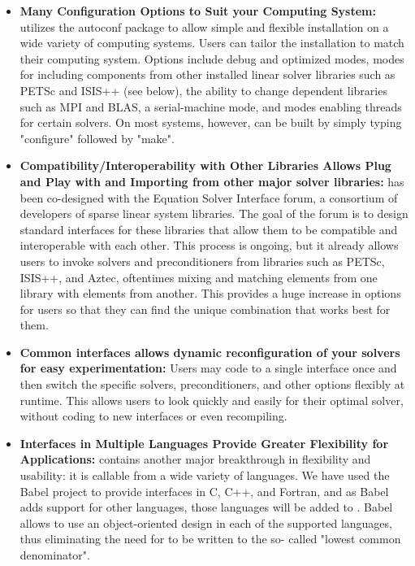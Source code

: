 \begin{itemize}
\item
{\bf Many Configuration Options to Suit your Computing System:} \hypre{} utilizes the
autoconf package to 
allow simple and flexible installation on a wide variety of computing systems.
Users can tailor the 
installation to match their computing system. Options include debug and
optimized modes, modes for 
including components from other installed linear solver libraries such as PETSc
and ISIS++ (see below), 
the ability to change dependent libraries such as MPI and BLAS, a
serial-machine mode, and modes 
enabling threads for certain solvers. On most systems, however, \hypre{} can be
built by simply typing 
"configure" followed by "make".

\item
{\bf Compatibility/Interoperability with Other Libraries Allows Plug and Play with
and Importing from 
other major solver libraries:} \hypre{} has been co-designed with the Equation
Solver Interface forum, a 
consortium of developers of sparse linear system libraries. The goal of the
forum is to design standard 
interfaces for these libraries that allow them to be compatible and
interoperable with each other. This 
process is ongoing, but it already allows \hypre{} users to invoke solvers and
preconditioners from libraries 
such as PETSc, ISIS++, and Aztec, oftentimes mixing and matching elements from
one library with 
elements from another. This provides a huge increase in options for users so
that they can find the unique 
combination that works best for them.

\item
{\bf Common interfaces allows dynamic reconfiguration of your solvers for easy
experimentation:} Users 
may code to a single interface once and then switch the specific solvers,
preconditioners, and other options 
flexibly at runtime. This allows users to look quickly and easily for their
optimal solver, without coding to 
new interfaces or even recompiling. 

\item
{\bf Interfaces in Multiple Languages Provide Greater Flexibility for Applications:}
\hypre{} contains 
another major breakthrough in flexibility and usability: it is callable from a
wide variety of languages. We 
have used the Babel project to provide interfaces in C, C++, and Fortran, and
as Babel adds support for 
other languages, those languages will be added to \hypre{}. Babel allows \hypre{} to
use an object-oriented 
design in each of the supported languages, thus eliminating the need for \hypre{}
to be written to the so-
called "lowest common denominator".

\end{itemize}

